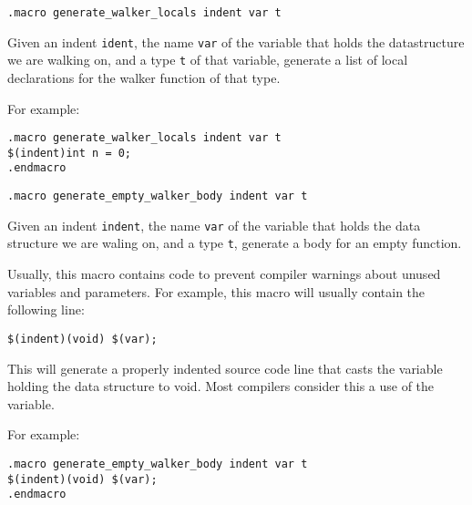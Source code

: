 \begin{verbatim}
.macro generate_walker_locals indent var t
\end{verbatim}
\begin{desc}
Given an indent \verb'ident', the name \verb'var' of the variable
that holds the datastructure we are walking on, and a type \verb't'
of that variable, generate a list of local
declarations for the walker function of that type.
\par
For example:
\begin{verbatim}
.macro generate_walker_locals indent var t
$(indent)int n = 0;
.endmacro
\end{verbatim}
\end{desc}
\begin{verbatim}
.macro generate_empty_walker_body indent var t
\end{verbatim}
\begin{desc}
Given an indent \verb'indent', the name \verb'var' of the variable
that holds the data structure we are waling on, and a type \verb't',
generate a body for an empty function.

Usually, this macro contains code to prevent compiler warnings
about unused variables and parameters.
For example, this macro will usually contain the following line:
\begin{verbatim}
$(indent)(void) $(var);
\end{verbatim}
This will generate a properly indented source code line that casts the
variable holding the data structure to void. Most compilers consider
this a use of the variable.
\par
For example:
\begin{verbatim}
.macro generate_empty_walker_body indent var t
$(indent)(void) $(var);
.endmacro
\end{verbatim}
\end{desc}
